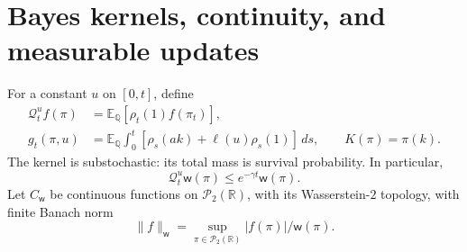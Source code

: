 \documentclass[11pt,a4paper]{article}
\theoremstyle{definition}
\theoremstyle{remark}
\newcommand{\R}{\mathbb R}
\newcommand{\E}{\mathbb E}
\newcommand{\Qq}{\mathbb Q}
\newcommand{\Ptwo}{\mathcal P_2(\R)}
\newcommand{\CW}{C_{\mathsf w}}
\newcommand{\wt}{\mathsf w}
\newcommand{\cQ}{\mathcal Q}
\begin{document}
\section{Bayes kernels, continuity, and measurable updates}

For a constant \(u\) on \([0,t]\), define
\begin{align}
 \cQ_t^u f(\pi)&=\E_\Qq[\rho_t(1)f(\pi_t)],\label{eq:Q}\\
 g_t(\pi,u)&=\E_\Qq\int_0^t
        [\rho_s(ak)+\ell(u)\rho_s(1)]\,ds,\qquad K(\pi)=\pi(k).
        \label{eq:g}
\end{align}
The kernel is substochastic: its total mass is survival probability.
In particular,
\begin{equation}\label{eq:Qweight}
 \cQ_t^u\wt(\pi)\leq e^{-\gamma t}\wt(\pi).
\end{equation}
Let \(\CW\) be continuous functions on \(\Ptwo\), with its
Wasserstein-\(2\) topology, with finite Banach norm
\[
 \|f\|_{\wt}=\sup_{\pi\in\Ptwo}|f(\pi)|/\wt(\pi).
\]
\end{document}
